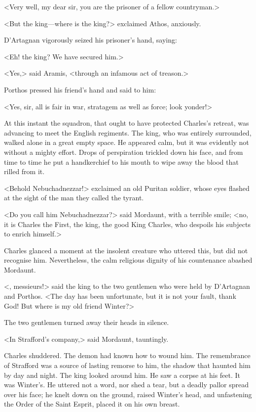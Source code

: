 <Very well, my dear sir, you are the prisoner of a fellow countryman.>

<But the king—where is the king?> exclaimed Athos, anxiously.

D'Artagnan vigorously seized his prisoner's hand, saying:

<Eh! the king? We have secured him.>

<Yes,> said Aramis, <through an infamous act of treason.>

Porthos pressed his friend's hand and said to him:

<Yes, sir, all is fair in war, stratagem as well as force; look yonder!>

At this instant the squadron, that ought to have protected Charles's retreat, was advancing to meet the English regiments. The king, who was entirely surrounded, walked alone in a great empty space. He appeared calm, but it was evidently not without a mighty effort. Drops of perspiration trickled down his face, and from time to time he put a handkerchief to his mouth to wipe away the blood that rilled from it.

<Behold Nebuchadnezzar!> exclaimed an old Puritan soldier, whose eyes flashed at the sight of the man they called the tyrant.

<Do you call him Nebuchadnezzar?> said Mordaunt, with a terrible smile; <no, it is Charles the First, the king, the good King Charles, who despoils his subjects to enrich himself.>

Charles glanced a moment at the insolent creature who uttered this, but did not recognise him. Nevertheless, the calm religious dignity of his countenance abashed Mordaunt.

<, messieurs!> said the king to the two gentlemen who were held by D'Artagnan and Porthos. <The day has been unfortunate, but it is not your fault, thank God! But where is my old friend Winter?>

The two gentlemen turned away their heads in silence.

<In Strafford's company,> said Mordaunt, tauntingly.

Charles shuddered. The demon had known how to wound him. The remembrance of Strafford was a source of lasting remorse to him, the shadow that haunted him by day and night. The king looked around him. He saw a corpse at his feet. It was Winter's. He uttered not a word, nor shed a tear, but a deadly pallor spread over his face; he knelt down on the ground, raised Winter's head, and unfastening the Order of the Saint Esprit, placed it on his own breast.

